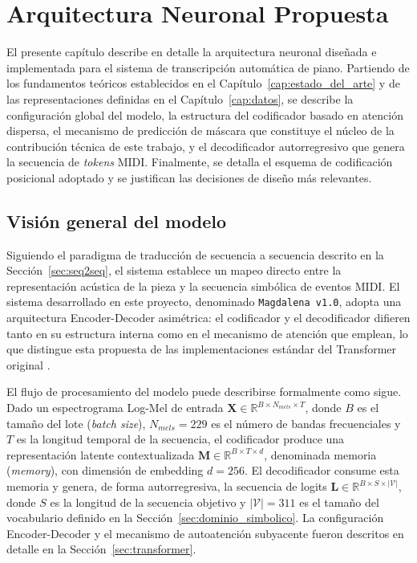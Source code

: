 
\chapter{Arquitectura Neuronal Propuesta}
\label{cap:arquitectura}

El presente capítulo describe en detalle la arquitectura neuronal diseñada e implementada
para el sistema de transcripción automática de piano. Partiendo de los fundamentos
teóricos establecidos en el Capítulo~\ref{cap:estado_del_arte} y de las representaciones
definidas en el Capítulo~\ref{cap:datos}, se describe la configuración global del modelo,
la estructura del codificador basado en atención dispersa, el mecanismo de predicción de
máscara que constituye el núcleo de la contribución técnica de este trabajo, y el
decodificador autorregresivo que genera la secuencia de \textit{tokens} MIDI. Finalmente,
se detalla el esquema de codificación posicional adoptado y se justifican las decisiones de
diseño más relevantes.

\section{Visión general del modelo}
\label{sec:vision_general}

Siguiendo el paradigma de traducción de secuencia a secuencia
descrito en la Sección~\ref{sec:seq2seq}, el sistema establece
un mapeo directo entre la representación acústica de la pieza y
la secuencia simbólica de eventos MIDI. El sistema desarrollado
en este proyecto, denominado \texttt{Magdalena v1.0}, adopta una
arquitectura Encoder-Decoder asimétrica: el codificador y el
decodificador difieren tanto en su estructura interna como en el
mecanismo de atención que emplean, lo que distingue esta propuesta
de las implementaciones estándar del Transformer original
\cite{vaswani2017attention}.

El flujo de procesamiento del modelo puede describirse formalmente como sigue. Dado un
espectrograma Log-Mel de entrada $\mathbf{X} \in \mathbb{R}^{B \times N_{mels} \times T}$,
donde $B$ es el tamaño del lote (\textit{batch size}), $N_{mels} = 229$ es el número de
bandas frecuenciales y $T$ es la longitud temporal de la secuencia, el codificador produce
una representación latente contextualizada $\mathbf{M} \in \mathbb{R}^{B \times T \times d}$,
denominada memoria (\textit{memory}), con dimensión de embedding $d = 256$. El
decodificador consume esta memoria y genera, de forma autorregresiva, la secuencia de logits $\mathbf{L} \in \mathbb{R}^{B \times S \times |\mathcal{V}|}$,
donde $S$ es la longitud de la secuencia objetivo y $|\mathcal{V}| = 311$ es el tamaño
del vocabulario definido en la Sección~\ref{sec:dominio_simbolico}. La configuración
Encoder-Decoder y el mecanismo de autoatención subyacente fueron descritos en detalle
en la Sección~\ref{sec:transformer}.

